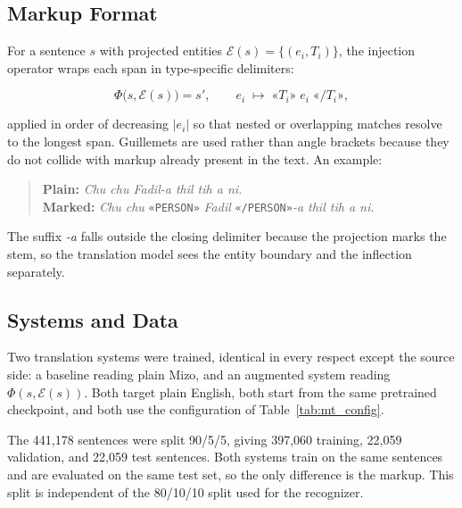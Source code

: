\documentclass[acmsmall,screen,review]{acmart}
\begin{document}
\subsection{Markup Format}
\label{sec:mt:format}

For a sentence $s$ with projected entities
$\mathcal{E}(s) = \{(e_i, T_i)\}$, the injection operator wraps each span in
type-specific delimiters:

\begin{equation}
\label{eq:inject}
\Phi\bigl(s, \mathcal{E}(s)\bigr) = s',
\qquad
e_i \;\longmapsto\; \texttt{«}T_i\texttt{»}\; e_i \;\texttt{«/}T_i\texttt{»},
\end{equation}

applied in order of decreasing $|e_i|$ so that nested or overlapping matches
resolve to the longest span. Guillemets are used rather than angle brackets
because they do not collide with markup already present in the text. An example:

\begin{quote}
\textbf{Plain:} \textit{Chu chu Fadil-a thil tih a ni.}\\
\textbf{Marked:} \textit{Chu chu} \texttt{«PERSON»} \textit{Fadil} \texttt{«/PERSON»}\textit{-a thil tih a ni.}
\end{quote}

The suffix \textit{-a} falls outside the closing delimiter because the
projection marks the stem, so the translation model sees the entity boundary and
the inflection separately.

\subsection{Systems and Data}
\label{sec:mt:setup}

Two translation systems were trained, identical in every respect except the
source side: a baseline reading plain Mizo, and an augmented system reading
$\Phi(s, \mathcal{E}(s))$. Both target plain English, both start from the same
pretrained checkpoint, and both use the configuration of
Table~\ref{tab:mt_config}.

The 441,178 sentences were split 90/5/5, giving 397,060 training, 22,059
validation, and 22,059 test sentences. Both systems train on the same sentences
and are evaluated on the same test set, so the only difference is the markup.
This split is independent of the 80/10/10 split used for the recognizer.
\end{document}
